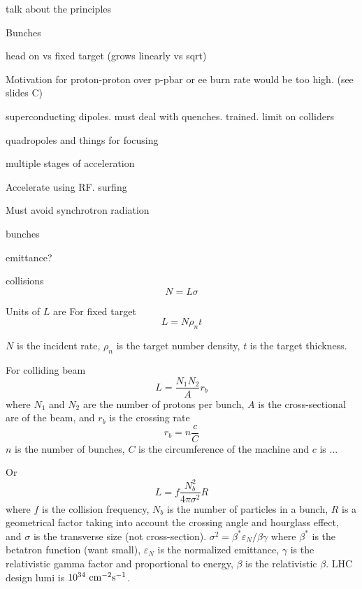 talk about the principles

Bunches 

head on vs fixed target (grows linearly vs sqrt)



Motivation for proton-proton over p-pbar or ee
burn rate would be too high. (see slides C)

superconducting dipoles. must deal with quenches. trained.
limit on colliders

quadropoles and things for focusing

multiple stages of acceleration

Accelerate using RF. surfing

Must avoid synchrotron radiation


bunches

emittance?

collisions
\begin{equation}
N= L\sigma
\end{equation}

Units of $L$ are \lumiunits
For fixed target
\begin{equation}
L = N \rho_n t
\end{equation}

$N$ is the incident rate, $\rho_n$ is the target number
density, $t$ is the target thickness.

For colliding beam
\begin{equation}
L = \frac{N_1 N_2}{A} r_b
\end{equation}
where $N_1$ and $N_2$ are the number of protons per bunch, 
$A$ is the cross-sectional are of the beam, 
and $r_b$ is the crossing rate
\begin{equation}
r_b = n \frac{c}{C}
\end{equation}
$n$ is the number of bunches, $C$ is the circumference of the machine
and $c$ is ...

Or 
\begin{equation}
L=f \frac{N_b^2}{4\pi\sigma^2} R
\end{equation}
where $f$ is the collision frequency, $N_b$ is the number
of particles in a bunch, $R$ is a geometrical factor
taking into account the crossing angle and hourglass effect, 
and $\sigma$ is the transverse size (not cross-section).
$\sigma^2 = \beta^* \varepsilon_N/ \beta\gamma$
where $\beta^*$ is the betatron function (want small), 
$\varepsilon_N$ is the normalized emittance, $\gamma$ is the 
relativistic gamma factor and proportional to energy, $\beta$ is the 
relativistic $\beta$.
LHC design lumi is $10^{34}~\textrm{cm}^{-2}\textrm{s}^{-1}$.

